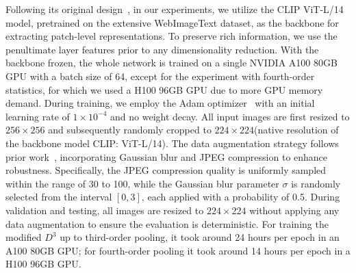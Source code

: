 \documentclass[letterpaper,twocolumn,10pt]{article}
\newcommand{\subhead}[1]{\vspace{1pt}\noindent{\textbf{#1.}}}
\begin{document}
\subhead{Improvement of $\mathbf{D}^\mathbf{3}$}
Following its original design~\cite{yang2025d3}, in our experiments, we utilize the CLIP ViT-L/14 model, pretrained on the extensive WebImageText dataset, as the backbone for extracting patch-level representations. To preserve rich information, we use the penultimate layer features prior to any dimensionality reduction. With the backbone frozen, the whole network is trained on a single NVIDIA A100 80GB GPU with a batch size of 64, 
except for the experiment with fourth-order statistics, for which we used a H100 96GB GPU due to more GPU memory demand.  During training, we employ the Adam optimizer~\cite{Kingma2014AdamAM} with an initial learning rate of \(1 \times 10^{-4}\) and no weight decay. 
All input images are first resized to \(256 \times 256\) and subsequently randomly cropped to \(224 \times 224\)(native resolution of the backbone model CLIP: ViT-L/14). 
The data augmentation strategy follows prior work~\cite{Ojha2023ufd, Wang2024cnngenerated}, incorporating Gaussian blur and JPEG compression to enhance robustness. Specifically, the JPEG compression quality is uniformly sampled within the range of 30 to 100, while the Gaussian blur parameter \(\sigma\) is randomly selected from the interval \([0, 3]\), each applied with a probability of 0.5. 
During validation and testing, all images are resized to \(224 \times 224\) without applying any data augmentation to ensure the evaluation is deterministic. For training the modified $D^3$ up to third-order pooling, it took around 24 hours per epoch in an A100 80GB GPU; for fourth-order pooling it took around 14 hours per epoch in a H100 96GB GPU.
\end{document}
